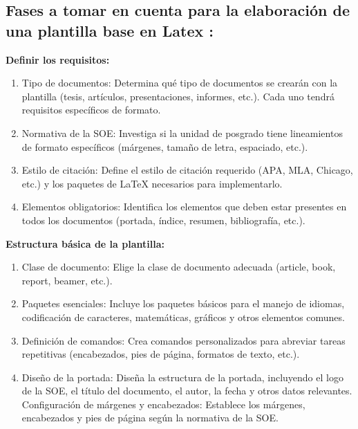 \documentclass[10pt,twocolumn,a4paper]{article}
\begin{document}
    \subsection{Fases a tomar en cuenta para la elaboración de una plantilla base en Latex :}
    
{\raggedleft \textbf{Definir los requisitos:}}
    \begin{enumerate}
        \item Tipo de documentos: Determina qué tipo de documentos se crearán con la plantilla (tesis, artículos, presentaciones, informes, etc.). Cada uno tendrá requisitos específicos de formato.
        \item Normativa de la SOE: Investiga si la unidad de posgrado tiene lineamientos de formato específicos (márgenes, tamaño de letra, espaciado, etc.).
        \item Estilo de citación: Define el estilo de citación requerido (APA, MLA, Chicago, etc.) y los paquetes de LaTeX necesarios para implementarlo.
        \item Elementos obligatorios: Identifica los elementos que deben estar presentes en todos los documentos (portada, índice, resumen, bibliografía, etc.).
    \end{enumerate}
    
{\raggedleft \textbf{Estructura básica de la plantilla:}}
    \begin{enumerate}
        \item Clase de documento: Elige la clase de documento adecuada (article, book, report, beamer, etc.).
        \item Paquetes esenciales: Incluye los paquetes básicos para el manejo de idiomas, codificación de caracteres, matemáticas, gráficos y otros elementos comunes.
        \item Definición de comandos: Crea comandos personalizados para abreviar tareas repetitivas (encabezados, pies de página, formatos de texto, etc.).
        \item Diseño de la portada: Diseña la estructura de la portada, incluyendo el logo de la SOE, el título del documento, el autor, la fecha y otros datos relevantes.
    Configuración de márgenes y encabezados: Establece los márgenes, encabezados y pies de página según la normativa de la SOE.
    \end{enumerate}
\end{document}
